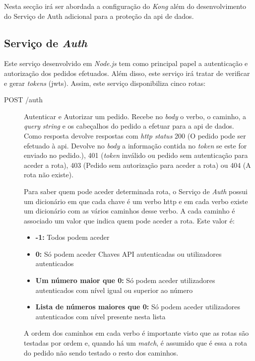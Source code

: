 Nesta secção irá ser abordada a configuração do \textit{Kong} além do desenvolvimento do Serviço de Auth adicional para a proteção da \acrshort{api} de dados.

\subsection{Serviço de \textit{Auth}}
Este serviço desenvolvido em \textit{Node.js} tem como principal papel a autenticação e autorização dos pedidos efetuados. Além disso, este serviço irá tratar de verificar e gerar \textit{tokens} (\acrshort{jwt}s). Assim, este serviço disponibiliza cinco rotas:
\begin{description}
    \item[POST /auth] Autenticar e Autorizar um pedido. Recebe no \textit{body} o verbo, o caminho, a \textit{query string} e os cabeçalhos do pedido a efetuar para a \acrshort{api} de dados. Como resposta devolve respostas com \textit{\acrshort{http} status} 200 (O pedido pode ser efetuado à \acrshort{api}. Devolve no \textit{body}  a informação contida no \textit{token} se este for enviado no pedido.), 401 (\textit{token} inválido ou pedido sem autenticação para aceder a rota), 403 (Pedido sem autorização para aceder a rota) ou 404 (A rota não existe).

        Para saber quem pode aceder determinada rota, o Serviço de \textit{Auth} possui um dicionário em que cada chave é um verbo \acrshort{http} e em cada verbo existe um dicionário com as vários caminhos desse verbo. A cada caminho é associado um valor que indica quem pode aceder a rota. Este valor é:
        \begin{itemize}
            \item \textbf{-1:} Todos podem aceder
            \item \textbf{0:} Só podem aceder Chaves API autenticadas ou utilizadores autenticados
            \item \textbf{Um número maior que 0:} Só podem aceder utilizadores autenticados com nível igual ou superior ao número
            \item \textbf{Lista de números maiores que 0:} Só podem aceder utilizadores autenticados com nível presente nesta lista
        \end{itemize}
        A ordem dos caminhos em cada verbo é importante visto que as rotas são testadas por ordem e, quando há um \textit{match}, é assumido que é essa a rota do pedido não sendo testado o resto dos caminhos.


\end{description}
